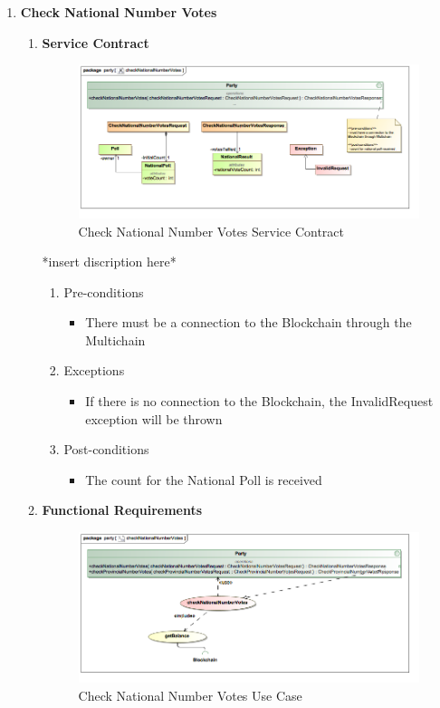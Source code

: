 \begin{enumerate}
	\item \textbf{Check National Number Votes}
		\begin{enumerate}
			\item \textbf{Service Contract}
				\begin{figure}[H]
					\centering
					\includegraphics[width=0.75\linewidth]{../Images/Party/ServiceContracts/CheckNationalNumberVotes_ServiceContract.png}
					\caption{Check National Number Votes Service Contract}
				\end{figure}
				
				*insert discription here*
				\newline				
				
				\begin{enumerate}
					\item Pre-conditions
					\begin{itemize}
						\item There must be a connection to the Blockchain through the Multichain
					\end{itemize}
					
					\item Exceptions
					\begin{itemize}
						\item If there is no connection to the Blockchain, the InvalidRequest exception will be thrown
					\end{itemize}
					
					\item Post-conditions
					\begin{itemize}
						\item The count for the National Poll is received
					\end{itemize}
				\end{enumerate}
			
			\item \textbf{Functional Requirements}
				\begin{figure}[H]
					\centering
					\includegraphics[width=0.75\linewidth]{../Images/Party/UseCases/CheckNationalNumberVotes_UseCase.png}
					\caption{Check National Number Votes Use Case}
				\end{figure}
				

\end{enumerate}
\end{enumerate}

